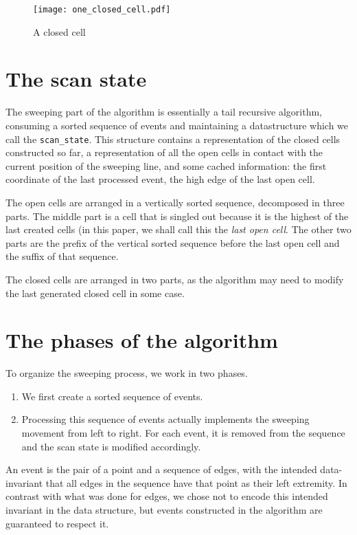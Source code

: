 \documentclass[a4paper, USenglish, cleveref, autoref, thm-restate]{lipics-v2021}
\begin{document}
\begin{figure}
\texttt{[image: one\_closed\_cell.pdf]}
\caption{A closed cell}
\end{figure}


\section{The scan state}

The sweeping part of the algorithm is essentially a tail recursive
algorithm, consuming a sorted sequence of events and
maintaining a datastructure which we call the {\tt scan\_state}.  This
structure contains a representation of the closed cells constructed so
far, a representation of all the open cells in contact with the
current position of the sweeping line, and some cached information:
the first coordinate of the last processed event, the high edge of the
last open cell.

The open cells are arranged in a vertically sorted sequence,
decomposed in three parts.  The middle part is a cell that is singled
out because it is the highest of the last created cells (in this
paper, we shall call this the {\em last open cell}.  The other two
parts are the prefix of the vertical sorted sequence before the last
open cell and the suffix of that sequence.

The closed cells are arranged in two parts, as the algorithm may need
to modify the last generated closed cell in some case.

\section{The phases of the algorithm}
To organize the sweeping process, we work in two phases.
\begin{enumerate}
\item  We first
create a sorted sequence of events.
\item Processing this sequence of
  events actually implements the sweeping movement from left to right.
  For each event, it is removed from the sequence and the scan state
  is modified accordingly.
\end{enumerate}

An event is the pair of a point and a sequence of edges, with the
intended data-invariant
that all edges in the sequence have that point as their left
extremity.  In contrast with what was done for edges, we chose not
to encode this intended invariant in the data structure, but
events constructed in the algorithm are guaranteed to respect it.
\end{document}
